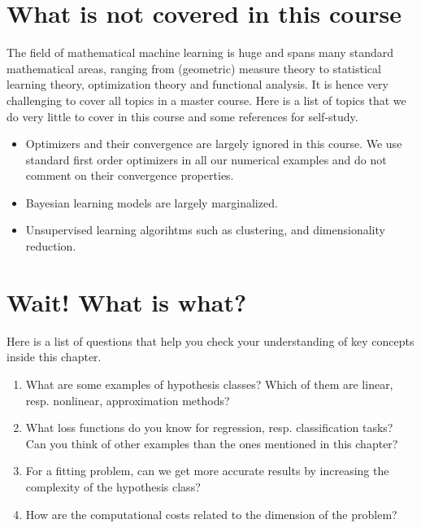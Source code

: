 \section*{What is not covered in this course}
The field of mathematical machine learning is huge and spans many standard
mathematical areas, ranging from (geometric) measure theory to statistical
learning theory, optimization theory and functional analysis. It is hence very
challenging to cover all topics in a master course. Here is a list of topics
that we do very little to cover in this course and some references for
self-study. 

\begin{itemize}
    \item Optimizers and their convergence are largely ignored in this course.
    We use standard first order optimizers in all our numerical examples and do
    not comment on their convergence properties. 
    \item Bayesian learning models are largely marginalized.
    \item Unsupervised learning algorihtms such as clustering, and
    dimensionality reduction.
\end{itemize}



\section*{Wait! What is what?}
Here is a list of questions that help you check your understanding of key
concepts inside this chapter.

\begin{enumerate}
    \item What are some examples of hypothesis classes? Which of them are
    linear, resp. nonlinear, approximation methods?
    \item What loss functions do you know for regression, resp. classification
    tasks? Can you think of other examples than the ones mentioned in this
    chapter?
    \item For a fitting problem, can we get more accurate results by increasing
    the complexity of the hypothesis class?
    \item How are the computational costs related to the dimension of the
    problem? 
\end{enumerate}

